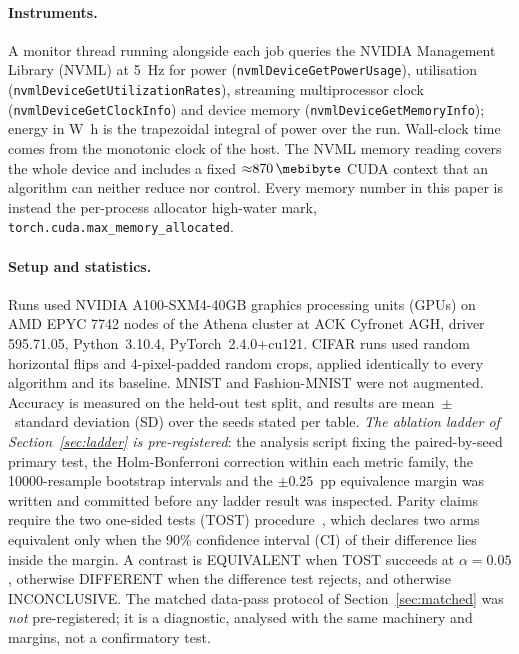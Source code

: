 \documentclass{llncs}
\begin{document}
\paragraph{Instruments.}
A monitor thread running alongside each job queries the
NVIDIA Management Library (NVML) at \SI{5}{\hertz} for power
(\texttt{nvmlDeviceGetPowerUsage}), utilisation
(\texttt{nvmlDeviceGetUtilizationRates}), streaming multiprocessor clock
(\texttt{nvmlDeviceGetClockInfo}) and device memory
(\texttt{nvmlDeviceGetMemoryInfo}); energy in \si{\watt\hour} is the
trapezoidal integral of power over the run. Wall-clock time comes from the
monotonic clock of the host.
The NVML memory reading covers the whole device and includes a fixed
${\approx}\SI{870}{\mebibyte}$ CUDA context that an algorithm can
neither reduce nor control. Every memory number in this paper is instead the
per-process allocator high-water mark,
\texttt{torch.cuda.max\_memory\_allocated}.

\paragraph{Setup and statistics.}
Runs used NVIDIA A100-SXM4-40GB graphics processing units (GPUs) on AMD EPYC
7742 nodes of the Athena cluster at ACK Cyfronet AGH, driver 595.71.05, Python~3.10.4, PyTorch~2.4.0+cu121. CIFAR runs
used random horizontal flips and \num{4}-pixel-padded random crops, applied
identically to every algorithm and its baseline. MNIST and Fashion-MNIST were
not augmented. Accuracy is measured on the held-out test split, and results are
mean~$\pm$~standard deviation (SD) over the seeds stated per table.
\emph{The ablation ladder of Section~\ref{sec:ladder} is pre-registered}: the
analysis script fixing the paired-by-seed primary test, the Holm-Bonferroni
correction within each metric family, the \num{10000}-resample bootstrap
intervals and the $\pm\num{0.25}$~pp equivalence margin was written and
committed before any ladder result was inspected. Parity claims require the
two one-sided tests (TOST) procedure~\cite{schuirmann1987comparison,lakens2017equivalence},
which declares two arms equivalent only when the \num{90}\% confidence
interval (CI) of their difference lies inside the margin. A contrast is EQUIVALENT
when TOST succeeds at $\alpha = 0.05$, otherwise DIFFERENT when the difference
test rejects, and otherwise INCONCLUSIVE.
The matched data-pass protocol of Section~\ref{sec:matched} was
\emph{not} pre-registered; it is a diagnostic, analysed with the same
machinery and margins, not a confirmatory test.
\end{document}
